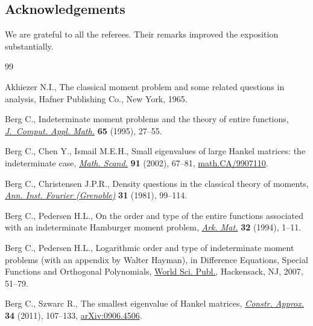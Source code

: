 \documentclass[pdftex]{sigma}
\numberwithin{equation}{section}
\begin{document}
\subsection*{Acknowledgements}
\vspace{-1.5mm}

We are grateful to all the referees. Their remarks improved the exposition substantially.

\vspace{-2.5mm}

\begin{thebibliography}{99}
\footnotesize\itemsep=-1.1pt

Akhiezer N.I., The classical moment problem and some related questions in
 analysis, Hafner Publishing Co., New York, 1965.

Berg C., Indeterminate moment problems and the theory of entire functions,
 \href{https://doi.org/10.1016/0377-0427(95)00099-2}{\textit{J.~Comput. Appl. Math.}} \textbf{65} (1995), 27--55.

Berg C., Chen Y., Ismail M.E.H., Small eigenvalues of large {H}ankel matrices:
 the indeterminate case, \href{https://doi.org/10.7146/math.scand.a-14379}{\textit{Math. Scand.}} \textbf{91} (2002), 67--81,
 \href{https://arxiv.org/abs/math.CA/9907110}{math.CA/9907110}.

Berg C., Christensen J.P.R., Density questions in the classical theory of
 moments, \href{https://doi.org/10.5802/aif.840}{\textit{Ann. Inst. Fourier (Grenoble)}} \textbf{31} (1981), 99--114.

Berg C., Pedersen H.L., On the order and type of the entire functions
 associated with an indeterminate {H}amburger moment problem, \href{https://doi.org/10.1007/BF02559520}{\textit{Ark.
 Mat.}} \textbf{32} (1994), 1--11.

Berg C., Pedersen H.L., Logarithmic order and type of indeterminate moment
 problems (with an appendix by {W}alter {H}ayman), in Difference Equations,
 Special Functions and Orthogonal Polynomials,
 \href{https://doi.org/10.1142/9789812770752_0005}{World Sci. Publ.}, Hackensack, NJ, 2007, 51--79.

Berg C., Szwarc R., The smallest eigenvalue of {H}ankel matrices,
 \href{https://doi.org/10.1007/s00365-010-9109-4}{\textit{Constr. Approx.}} \textbf{34} (2011), 107--133, \href{https://arxiv.org/abs/0906.4506}{arXiv:0906.4506}.


\end{thebibliography}
\end{document}
